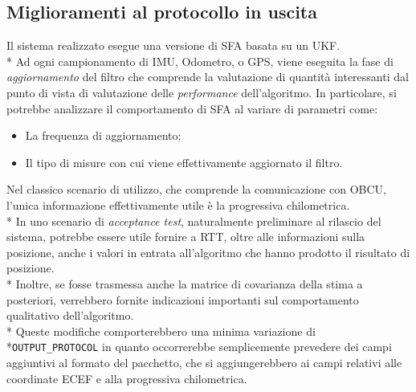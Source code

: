 \subsection{Miglioramenti al protocollo in uscita}
Il sistema realizzato esegue una versione di SFA basata su un UKF.\\*
Ad ogni campionamento di IMU, Odometro, o GPS, viene eseguita la fase di \emph{aggiornamento} del filtro che comprende la valutazione di quantit\`a interessanti dal punto di vista di valutazione delle \emph{performance} dell'algoritmo. In particolare, si potrebbe analizzare il comportamento di SFA al variare di parametri come:
\begin{itemize}
	\item La frequenza di aggiornamento;
	\item Il tipo di misure con cui viene effettivamente aggiornato il filtro.
\end{itemize}
Nel classico scenario di utilizzo, che comprende la comunicazione con OBCU, l'unica informazione effettivamente utile \`e la progressiva chilometrica.\\* In uno scenario di \emph{acceptance test}, naturalmente preliminare al rilascio del sistema, potrebbe essere utile fornire a RTT, oltre alle informazioni sulla posizione, anche i valori in entrata all'algoritmo che hanno prodotto il risultato di posizione.\\*
Inoltre, se fosse trasmessa anche la matrice di covarianza della stima a posteriori, verrebbero fornite indicazioni importanti sul comportamento qualitativo dell'algoritmo.\\*
Queste modifiche comporterebbero una minima variazione di\\*\texttt{OUTPUT\_PROTOCOL} in quanto occorrerebbe semplicemente prevedere dei campi aggiuntivi al formato del pacchetto, che si aggiungerebbero ai campi relativi alle coordinate ECEF e alla progressiva chilometrica.

